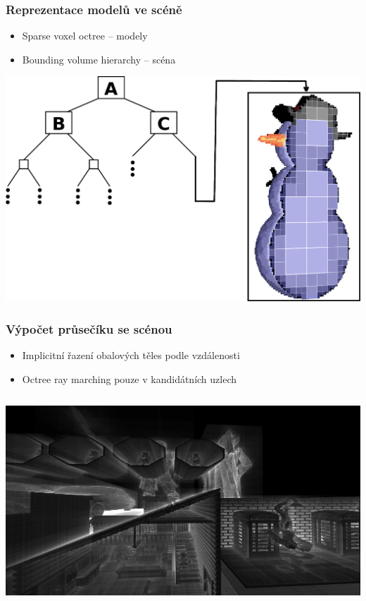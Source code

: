\documentclass[10pt,xcolor=pdflatex,hyperref={unicode}]{beamer}
\begin{document}
\begin{frame}\frametitle{Reprezentace modelů ve scéně}
    \begin{itemize}
        \item Sparse voxel octree -- modely
        \item Bounding volume hierarchy -- scéna
    \end{itemize}
    \includegraphics[scale=0.8]{img/scene_structure.png}%
\end{frame}

\begin{frame}\frametitle{Výpočet průsečíku se scénou}
    \begin{itemize}
        \item Implicitní řazení obalových těles podle vzdálenosti
        \item Octree ray marching pouze v kandidátních uzlech
    \end{itemize}
    \begin{column}{\textwidth}
        \includegraphics[width=\textwidth]{img/bvh_iter.png}
    \end{column}
\end{frame}
\end{document}
